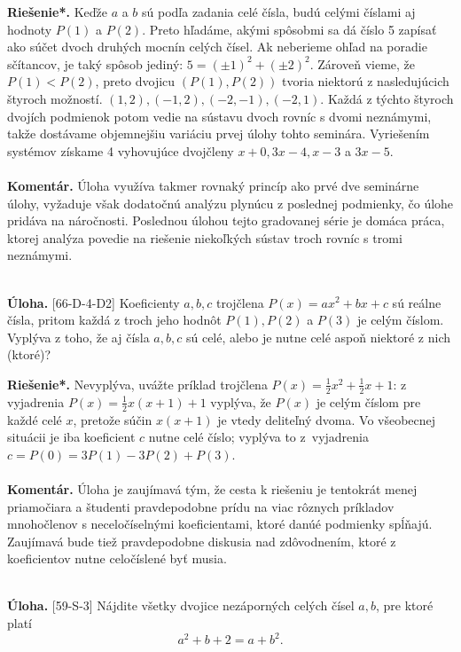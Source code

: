 \documentclass[11pt,a4paper,oneside,final]{book}
\newcommand{\kom}{\textbf{Komentár.} }
\newcommand{\ul}{\textbf{Úloha.} }
\newcommand{\rieh}{\textbf{Riešenie*.} }
\begin{document}
\rieh Keďže $a$ a $b$ sú podľa zadania celé čísla, budú celými číslami aj hodnoty $P(1)$ a $P(2)$. Preto hľadáme, akými spôsobmi sa dá číslo 5 zapísať ako súčet dvoch druhých mocnín celých čísel. Ak neberieme ohľad na poradie sčítancov, je taký spôsob jediný: $5 = (\pm 1)^2+ (\pm 2)^2$. Zároveň vieme, že $P(1)<P(2)$, preto dvojicu $(P(1), P(2))$ tvoria niektorú z nasledujúcich štyroch možností. $(1, 2), (-1, 2), (-2, -1), (-2, 1)$. Každá z týchto štyroch dvojích podmienok potom vedie na sústavu dvoch rovníc s dvomi neznámymi, takže dostávame objemnejšiu variáciu prvej úlohy tohto seminára. Vyriešením systémov získame 4 vyhovujúce dvojčleny $x + 0, 3x - 4, x - 3$ a $3x - 5$.\\
\\
\kom Úloha využíva takmer rovnaký princíp ako prvé dve seminárne úlohy, vyžaduje však dodatočnú analýzu plynúcu z poslednej podmienky, čo úlohe pridáva na náročnosti. Poslednou úlohou tejto gradovanej série je domáca práca, ktorej analýza povedie na riešenie niekoľkých sústav troch rovníc s tromi neznámymi.\\
\\
\begin{tcolorbox}[breakable,notitle,boxrule=0pt,colback=light-gray,colframe=light-gray]\ul [66-D-4-D2] Koeficienty $a, b, c$ trojčlena $P (x) = ax^2+ bx + c$ sú reálne čísla, pritom každá z troch jeho hodnôt $P (1), P (2)$ a $P (3)$ je celým číslom. Vyplýva z toho, že aj čísla $a, b, c$ sú celé, alebo je nutne celé aspoň niektoré z nich (ktoré)?

\end{tcolorbox}

\rieh Nevyplýva, uvážte príklad trojčlena $P (x) =\frac{1}{2}x^2+\frac{1}{2}x+1$: z vyjadrenia $P (x) =\frac{1}{2}x(x + 1) + 1$ vyplýva, že $P (x)$ je celým číslom pre každé celé $x$, pretože súčin $x(x + 1)$ je vtedy deliteľný dvoma. Vo všeobecnej situácii je iba koeficient $c$ nutne celé číslo; vyplýva to z~vyjadrenia $c = P (0) = 3P (1) - 3P (2) + P (3)$.\\
\\
\kom Úloha je zaujímavá tým, že cesta k riešeniu je tentokrát menej priamočiara a študenti pravdepodobne prídu na viac rôznych príkladov mnohočlenov s neceločíselnými koeficientami, ktoré danúé podmienky spĺňajú. Zaujímavá bude tiež pravdepodobne diskusia nad zdôvodnením, ktoré z koeficientov nutne celočíslené byť musia.\\
\\
\begin{tcolorbox}[breakable,notitle,boxrule=0pt,colback=light-gray,colframe=light-gray]\ul [59-S-3] Nájdite všetky dvojice nezáporných celých čísel $a, b$, pre ktoré platí
$$a^2 + b + 2 = a + b^2.$$

\end{tcolorbox}
\end{document}
